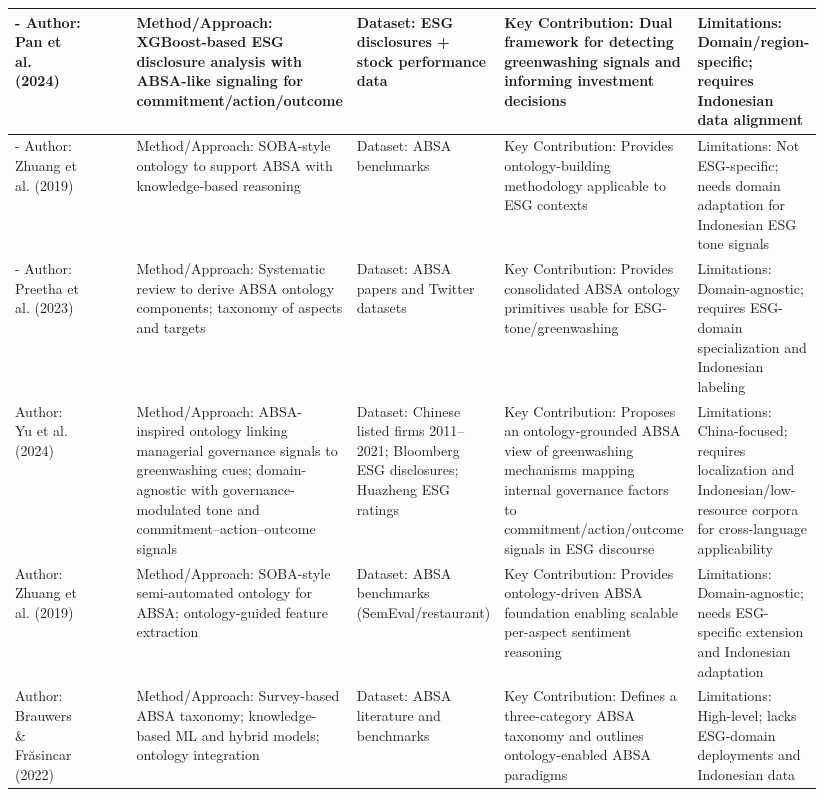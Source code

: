 \documentclass{article}
\begin{document}
\begin{landscape}
\begin{longtable}{p{0.157\linewidth} p{0.157\linewidth} p{0.157\linewidth} p{0.157\linewidth} p{0.157\linewidth} p{0.157\linewidth}}
- Author: Pan et al. (2024) & ~ & Method/Approach: XGBoost-based ESG disclosure analysis with ABSA-like signaling for commitment/action/outcome & Dataset: ESG disclosures + stock performance data & Key Contribution: Dual framework for detecting greenwashing signals and informing investment decisions & Limitations: Domain/region-specific; requires Indonesian data alignment \\ \hline
- Author: Zhuang et al. (2019) & ~ & Method/Approach: SOBA-style ontology to support ABSA with knowledge-based reasoning & Dataset: ABSA benchmarks & Key Contribution: Provides ontology-building methodology applicable to ESG contexts & Limitations: Not ESG-specific; needs domain adaptation for Indonesian ESG tone signals \\ \hline
- Author: Preetha et al. (2023) & ~ & Method/Approach: Systematic review to derive ABSA ontology components; taxonomy of aspects and targets & Dataset: ABSA papers and Twitter datasets & Key Contribution: Provides consolidated ABSA ontology primitives usable for ESG-tone/greenwashing & Limitations: Domain-agnostic; requires ESG-domain specialization and Indonesian labeling \\ \hline
Author: Yu et al. (2024) & ~ & Method/Approach: ABSA-inspired ontology linking managerial governance signals to greenwashing cues; domain-agnostic with governance-modulated tone and commitment–action–outcome signals & Dataset: Chinese listed firms 2011–2021; Bloomberg ESG disclosures; Huazheng ESG ratings & Key Contribution: Proposes an ontology-grounded ABSA view of greenwashing mechanisms mapping internal governance factors to commitment/action/outcome signals in ESG discourse & Limitations: China-focused; requires localization and Indonesian/low-resource corpora for cross-language applicability \\ \hline
Author: Zhuang et al. (2019) & ~ & Method/Approach: SOBA-style semi-automated ontology for ABSA; ontology-guided feature extraction & Dataset: ABSA benchmarks (SemEval/restaurant) & Key Contribution: Provides ontology-driven ABSA foundation enabling scalable per-aspect sentiment reasoning & Limitations: Domain-agnostic; needs ESG-specific extension and Indonesian adaptation \\ \hline
Author: Brauwers \& Frăsincar (2022) & ~ & Method/Approach: Survey-based ABSA taxonomy; knowledge-based ML and hybrid models; ontology integration & Dataset: ABSA literature and benchmarks & Key Contribution: Defines a three-category ABSA taxonomy and outlines ontology-enabled ABSA paradigms & Limitations: High-level; lacks ESG-domain deployments and Indonesian data \\ \hline

\end{longtable}
\end{landscape}
\end{document}
